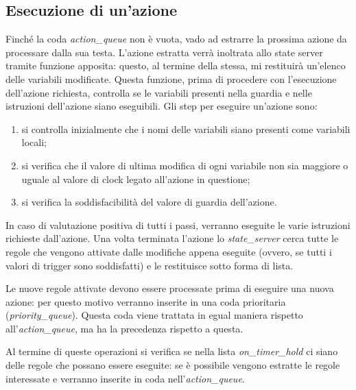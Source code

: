 \documentclass[italian]{memoir}
\begin{document}
\subsection{Esecuzione di un'azione}

Finché la coda \textit{action\_queue} non è vuota, vado ad estrarre la prossima azione da processare dalla sua testa. L'azione estratta verrà inoltrata allo state server tramite funzione apposita: questo, al termine della stessa, mi restituirà un'elenco delle variabili modificate. Questa funzione, prima di procedere con l'esecuzione dell'azione richiesta, controlla se le variabili presenti nella guardia e nelle istruzioni dell'azione siano eseguibili. Gli step per eseguire un'azione sono:
\begin{enumerate}
    \item si controlla inizialmente che i nomi delle variabili siano presenti come variabili locali;
    \item si verifica che il valore di ultima modifica di ogni variabile non sia maggiore o uguale al valore di clock legato all'azione in questione;
    \item si verifica la soddisfacibilità del valore di guardia dell'azione.
\end{enumerate}
In caso di valutazione positiva di tutti i passi, verranno eseguite le varie istruzioni richieste dall'azione. Una volta terminata l'azione lo \textit{state\_server} cerca tutte le regole che vengono attivate dalle modifiche appena eseguite (ovvero, se tutti i valori di trigger sono soddisfatti) e le restituisce sotto forma di lista.

Le nuove regole attivate devono essere processate prima di eseguire una nuova azione: per questo motivo verranno inserite in una coda prioritaria (\textit{priority\_queue}). Questa coda viene trattata in egual maniera rispetto all'\textit{action\_queue}, ma ha la precedenza rispetto a questa.

Al termine di queste operazioni si verifica se nella lista \textit{on\_timer\_hold} ci siano delle regole che possano essere eseguite: se è possibile vengono estratte le regole interessate e verranno inserite in coda nell'\textit{action\_queue}.
\end{document}
